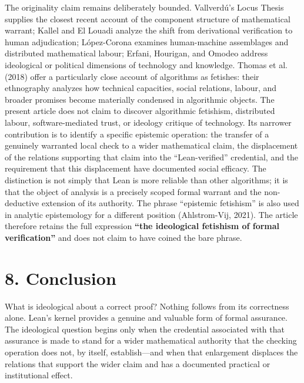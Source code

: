\documentclass[sn-apa]{sn-jnl}
\begin{document}
The originality claim remains deliberately bounded. Vallverdú’s Locus Thesis supplies the closest recent account of the component structure of mathematical warrant; Kallel and El Louadi analyze the shift from derivational verification to human adjudication; López-Corona examines human-machine assemblages and distributed mathematical labour; Erfani, Hourigan, and Omodeo address ideological or political dimensions of technology and knowledge. Thomas et al. (2018) offer a particularly close account of algorithms as fetishes: their ethnography analyzes how technical capacities, social relations, labour, and broader promises become materially condensed in algorithmic objects. The present article does not claim to discover algorithmic fetishism, distributed labour, software-mediated trust, or ideology critique of technology. Its narrower contribution is to identify a specific epistemic operation: the transfer of a genuinely warranted local check to a wider mathematical claim, the displacement of the relations supporting that claim into the “Lean-verified” credential, and the requirement that this displacement have documented social efficacy. The distinction is not simply that Lean is more reliable than other algorithms; it is that the object of analysis is a precisely scoped formal warrant and the non-deductive extension of its authority. The phrase “epistemic fetishism” is also used in analytic epistemology for a different position (Ahlstrom-Vij, 2021). The article therefore retains the full expression \textbf{“the ideological fetishism of formal verification”} and does not claim to have coined the bare phrase.

\section{8. Conclusion}

What is ideological about a correct proof? Nothing follows from its correctness alone. Lean’s kernel provides a genuine and valuable form of formal assurance. The ideological question begins only when the credential associated with that assurance is made to stand for a wider mathematical authority that the checking operation does not, by itself, establish—and when that enlargement displaces the relations that support the wider claim and has a documented practical or institutional effect.
\end{document}
